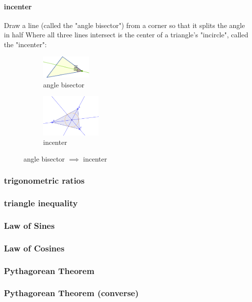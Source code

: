 \paragraph*{incenter} Draw a line (called the "angle bisector") from a corner so that it splits the angle in half
Where all three lines intersect is the center of a triangle's "incircle", called the "incenter":

\begin{figure}[h!]
    \centering
    \begin{subfigure}{3cm}
        \includegraphics[width=2.5cm]{./public/images/angle-bisector}
        \caption{angle bisector}
    \end{subfigure}
    \begin{subfigure}{3cm}
        \includegraphics[width=3cm]{./public/images/incenter}
        \caption{incenter}
    \end{subfigure}
    \caption{angle bisector $\implies$ incenter}
\end{figure}
\subsubsection{trigonometric ratios} 

\subsubsection{triangle inequality}

\subsubsection{Law of Sines}

\subsubsection{Law of Cosines}

\subsubsection{Pythagorean Theorem}

\subsubsection{Pythagorean Theorem (converse)}